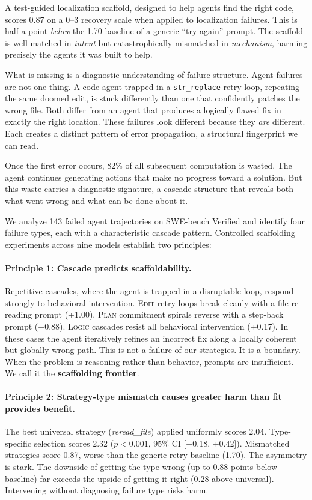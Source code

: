 \documentclass[11pt]{article}
\begin{document}
A test-guided localization scaffold, designed to help agents find the right code, scores 0.87 on a 0--3 recovery scale when applied to localization failures.
This is half a point \textit{below} the 1.70 baseline of a generic ``try again'' prompt.
The scaffold is well-matched in \textit{intent} but catastrophically mismatched in \textit{mechanism}, harming precisely the agents it was built to help.

What is missing is a diagnostic understanding of failure structure.
Agent failures are not one thing.
A code agent trapped in a \texttt{str\_replace} retry loop, repeating the same doomed edit, is stuck differently than one that confidently patches the wrong file.
Both differ from an agent that produces a logically flawed fix in exactly the right location.
These failures look different because they \textit{are} different.
Each creates a distinct pattern of error propagation, a structural fingerprint we can read.

Once the first error occurs, 82\% of all subsequent computation is wasted.
The agent continues generating actions that make no progress toward a solution.
But this waste carries a diagnostic signature, a cascade structure that reveals both what went wrong and what can be done about it.

We analyze 143 failed agent trajectories on SWE-bench Verified \citep{jimenez2024swebench} and identify four failure types, each with a characteristic cascade pattern.
Controlled scaffolding experiments across nine models establish two principles:

\paragraph{Principle 1: Cascade predicts scaffoldability.}
Repetitive cascades, where the agent is trapped in a disruptable loop, respond strongly to behavioral intervention.
\textsc{Edit} retry loops break cleanly with a file re-reading prompt (+1.00).
\textsc{Plan} commitment spirals reverse with a step-back prompt (+0.88).
\textsc{Logic} cascades resist all behavioral intervention (+0.17).
In these cases the agent iteratively refines an incorrect fix along a locally coherent but globally wrong path.
This is not a failure of our strategies. It is a boundary.
When the problem is reasoning rather than behavior, prompts are insufficient.
We call it the \textbf{scaffolding frontier}.

\paragraph{Principle 2: Strategy-type mismatch causes greater harm than fit provides benefit.}
The best universal strategy (\textit{reread\_file}) applied uniformly scores 2.04.
Type-specific selection scores 2.32 ($p<0.001$, 95\% CI [+0.18, +0.42]).
Mismatched strategies score 0.87, worse than the generic retry baseline (1.70).
The asymmetry is stark.
The downside of getting the type wrong (up to 0.88 points below baseline) far exceeds the upside of getting it right (0.28 above universal).
Intervening without diagnosing failure type risks harm.
\end{document}
